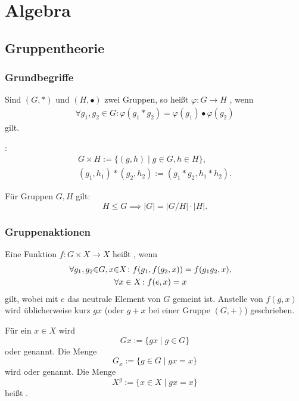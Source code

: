 
\chapter{Algebra}
\section{Gruppentheorie}
\subsection{Grundbegriffe}
\begin{Definition}
Sind $(G,*)$ und $(H,\bullet)$ zwei Gruppen, so
heißt $\varphi\colon G\to H$ 
, wenn
\begin{gather}
\forall g_1,g_2\in G\colon
  \varphi(g_1*g_2) = \varphi(g_1)\bullet\varphi(g_2)
\end{gather}
gilt.
\end{Definition}
\begin{Definition}
:
\begin{gather}
G\times H := \{(g,h)\mid g\in G, h\in H\},\\
(g_1,h_1)*(g_2,h_2) := (g_1*g_2, h_1*h_2).
\end{gather}
\end{Definition}
\noindent
{} Für Gruppen $G,H$ gilt:
\begin{equation}
H\le G\implies |G| = |G/H|\cdot |H|.
\end{equation}

\subsection{Gruppenaktionen}
\begin{Definition}
Eine Funktion $f\colon G\times X\to X$ heißt
, wenn
\begin{gather}
\hspace{-1em}\forall g_1,g_2{\in}G, x{\in}X\colon f(g_1,f(g_2,x)) = f(g_1 g_2,x),\\
\hspace{-1em}\forall x\in X\colon f(e,x) = x
\end{gather}
gilt, wobei mit $e$ das neutrale Element von $G$ gemeint ist.
Anstelle von $f(g,x)$ wird üblicherweise kurz $gx$ (oder
$g+x$ bei einer Gruppe $(G,+)$) geschrieben.
\end{Definition}
\begin{Definition}
Für ein $x\in X$ wird
\begin{equation}
Gx := \{gx\mid g\in G\}
\end{equation}
 oder  genannt.
Die Menge
\begin{equation}
G_x := \{g\in G\mid gx=x\}
\end{equation}
wird 
oder  genannt.
Die Menge
\begin{equation}
X^g := \{x\in X\mid gx=x\}
\end{equation}
heißt .
\end{Definition}

